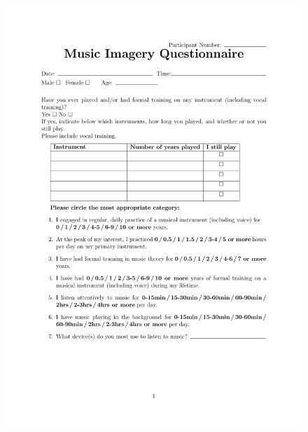 \begin{figure}[h]
   \centerline{\includegraphics[page=2,scale=0.75,trim={0in 1in 0in 0.5in},clip]{Figures/questionnaire.pdf}}
\end{figure}

